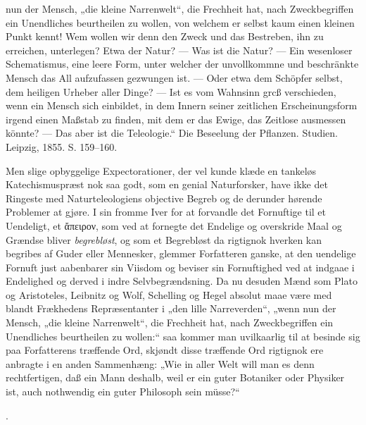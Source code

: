 \documentclass[12pt,a4paper]{book}
\begin{document}
{nun der Mensch, „die kleine Narrenwelt“, die Frechheit hat, nach Zweckbegriffen
ein Unendliches beurtheilen zu wollen, von welchem er selbst kaum einen kleinen
Punkt kennt! Wem wollen wir denn den Zweck und das Bestreben, ihn zu erreichen,
unterlegen? Etwa der Natur? --- Was ist die Natur? --- Ein wesenloser
Schematismus, eine leere Form, unter welcher der unvollkommne und beschränkte
Mensch das All aufzufassen gezwungen ist. --- Oder etwa dem Schöpfer selbst,
dem heiligen Urheber aller Dinge? --- Ist es vom Wahnsinn grcß verschieden,
wenn ein Mensch sich einbildet, in dem Innern seiner zeitlichen
Erscheinungsform irgend einen Maßstab zu finden, mit dem er das Ewige, das
Zeitlose ausmessen könnte? --- Das aber ist die Teleologie.“ Die Beseelung der
Pflanzen. Studien. Leipzig, 1855. S. 159--160.
\par Men slige opbyggelige Expectorationer, der vel kunde klæde en tankeløs
Katechismuspræst nok saa godt, som en genial Naturforsker, have ikke det
Ringeste med Naturteleologiens objective Begreb og de derunder hørende
Problemer at gjøre. I sin fromme Iver for at forvandle det Fornuftige til et
Uendeligt, et ἄπειρον, som ved at fornegte det Endelige og overskride Maal og
Grændse bliver \emph{begrebløst}, og som et Begrebløst da rigtignok hverken kan
begribes af Guder eller Mennesker, glemmer Forfatteren ganske, at den uendelige
Fornuft just aabenbarer sin Viisdom og beviser sin Fornuftighed ved at indgaae
i Endelighed og derved i indre Selvbegrændsning. Da nu desuden Mænd som Plato
og Aristoteles, Leibnitz og Wolf, Schelling og Hegel absolut maae være med
blandt Frækhedens Repræsentanter i „den lille Narreverden“, „wenn nun der
Mensch, „die kleine Narrenwelt“, die Frechheit hat, nach Zweckbegriffen ein
Unendliches beurtheilen zu wollen:“ saa kommer man uvilkaarlig til at besinde
sig paa Forfatterens træffende Ord, skjøndt disse træffende Ord rigtignok ere
anbragte i en anden Sammenhæng: „Wie in aller Welt will man es denn
rechtfertigen, daß ein Mann deshalb, weil er ein guter Botaniker oder Physiker
ist, auch nothwendig ein guter Philosoph sein müsse?“}.
\end{document}
